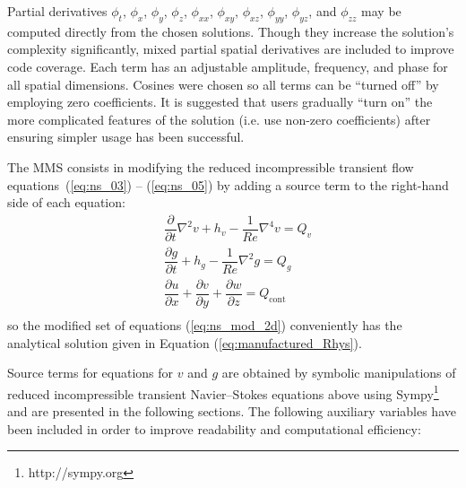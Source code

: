 \documentclass[10pt]{article}
\newcommand{\diff}[2] {\dfrac{\partial #1}{\partial #2}}
\begin{document}
\begin{landscape}
Partial
derivatives $\phi_{t }$, $\phi_{x }$, $\phi_{y }$, $\phi_{z }$, $\phi_{xx}$,
$\phi_{xy}$, $\phi_{xz}$, $\phi_{yy}$, $\phi_{yz}$, and $\phi_{zz}$ may be
computed directly from the chosen solutions. 
Though they increase the solution's complexity significantly, mixed partial
spatial derivatives are included to improve code coverage.  Each term has an
adjustable amplitude, frequency, and phase for all spatial dimensions.  Cosines
were chosen so all terms can be ``turned off'' by employing zero coefficients.
It is suggested that users gradually ``turn on'' the more complicated features
of the solution (i.e. use non-zero coefficients) after ensuring simpler usage
has been successful.







The MMS consists in modifying the reduced incompressible transient flow equations~(\ref{eq:ns_03}) -- (\ref{eq:ns_05}) by adding a source term to the right-hand side of each equation:
\begin{equation}
 \label{eq:ns_mod_2d}
\begin{split}
&\diff{}{t}\nabla^2 v + h_v - \dfrac{1}{Re} \nabla^4 v=Q_v\\
&\diff{g}{t} + h_g - \dfrac{1}{Re} \nabla^2 g=Q_g\\
&\diff{u}{x}+\diff{v}{y}+\diff{w}{z}=Q_\text{cont}\\
\end{split}
\end{equation}
%
so the modified set of equations (\ref{eq:ns_mod_2d}) conveniently has the analytical solution given in Equation (\ref{eq:manufactured_Rhys}).
%

Source terms for equations for $v$ and $g$ are obtained by symbolic manipulations of reduced incompressible transient Navier--Stokes equations above using Sympy\footnote{http://sympy.org} and are presented in the following sections.
 The following auxiliary variables have been included in order to improve readability and computational efficiency:





\end{landscape}
\end{document}
